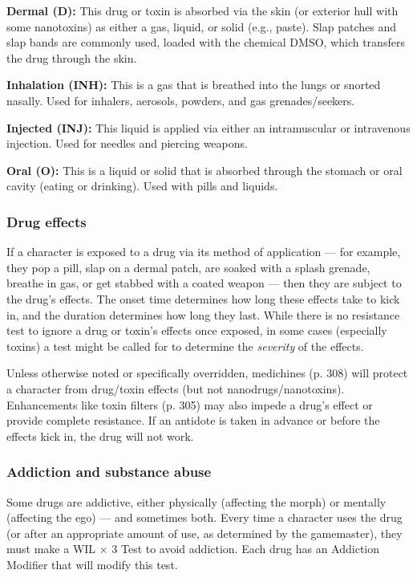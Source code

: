 \textbf{Dermal (D):} This drug or toxin is absorbed via the skin (or exterior hull with some nanotoxins) as either a gas, liquid, or solid (e.g., paste). Slap patches and slap bands are commonly used, loaded with the chemical DMSO, which transfers the drug through the skin.

\textbf{Inhalation (INH):} This is a gas that is breathed into the lungs or snorted nasally. Used for inhalers, aerosols, powders, and gas grenades/seekers.

\textbf{Injected (INJ):} This liquid is applied via either an intramuscular or intravenous injection. Used for needles and piercing weapons.

\textbf{Oral (O):} This is a liquid or solid that is absorbed through the stomach or oral cavity (eating or drinking). Used with pills and liquids.

\subsubsection{Drug effects}

If a character is exposed to a drug via its method of application --- for example, they pop a pill, slap on a dermal patch, are soaked with a splash grenade, breathe in gas, or get stabbed with a coated weapon ---  then they are subject to the drug’s effects. The onset time determines how long these effects take to kick in, and the duration determines how long they last. While there is no resistance test to ignore a drug or toxin’s effects once exposed, in some cases (especially toxins) a test might be called for to determine the \emph{severity} of the effects.

Unless otherwise noted or specifically overridden, medichines (p. 308) will protect a character from drug/toxin effects (but not nanodrugs/nanotoxins). Enhancements like toxin filters (p. 305) may also impede a drug’s effect or provide complete resistance. If an antidote is taken in advance or before the effects kick in, the drug will not work.

\subsubsection{Addiction and substance abuse}

Some drugs are addictive, either physically (affecting the morph) or mentally (affecting the ego) --- and sometimes both. Every time a character uses the drug (or after an appropriate amount of use, as determined by the gamemaster), they must make a WIL $\times$ 3 Test to avoid addiction. Each drug has an Addiction Modifier that will modify this test.

